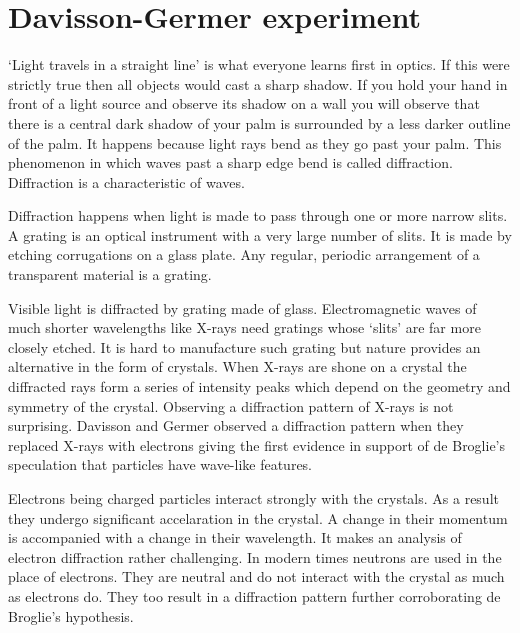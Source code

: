 \section{Davisson-Germer experiment}\label{c2s5}
`Light travels in a straight line' is what everyone learns first in optics. If
this were strictly true then all objects would cast a sharp shadow. If you hold
your hand in front of a light source and observe its shadow on a wall you will
observe that there is a central dark shadow of your palm is surrounded by a 
less darker outline of the palm. It happens because light rays bend as they go
past your palm. This phenomenon in which waves past a sharp edge bend is called
diffraction. Diffraction is a characteristic of waves.

Diffraction happens when light is made to pass through one or more narrow slits.
A grating is an optical instrument with a very large number of slits. It is
made by etching corrugations on a glass plate. Any regular, periodic arrangement
of a transparent material is a grating. 

Visible light is diffracted by grating made of glass. Electromagnetic waves of
much shorter wavelengths like X-rays need gratings whose `slits' are far more
closely etched. It is hard to manufacture such grating but nature provides an
alternative in the form of crystals. When X-rays are shone on a crystal the
diffracted rays form a series of intensity peaks which depend on the geometry
and symmetry of the crystal. Observing a diffraction pattern of X-rays is not
surprising. Davisson and Germer observed a diffraction pattern when they
replaced X-rays with electrons giving the first evidence in support of de
Broglie's speculation that particles have wave-like features.

Electrons being charged particles interact strongly with the crystals. As a 
result they undergo significant accelaration in the crystal. A change in their
momentum is accompanied with a change in their wavelength. It makes an analysis
of electron diffraction rather challenging. In modern times neutrons are used
in the place of electrons. They are neutral and do not interact with the crystal
as much as electrons do. They too result in a diffraction pattern further
corroborating de Broglie's hypothesis.

